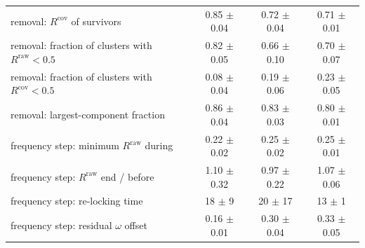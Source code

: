 \begin{tabular}{@{}lccc@{}}
removal: $R^{\mathrm{cov}}$ of survivors & 0.85 $\pm$ 0.04 & 0.72 $\pm$ 0.04 & 0.71 $\pm$ 0.01 \\
removal: fraction of clusters with $R^{\mathrm{raw}}<0.5$ & 0.82 $\pm$ 0.05 & 0.66 $\pm$ 0.10 & 0.70 $\pm$ 0.07 \\
removal: fraction of clusters with $R^{\mathrm{cov}}<0.5$ & 0.08 $\pm$ 0.04 & 0.19 $\pm$ 0.06 & 0.23 $\pm$ 0.05 \\
removal: largest-component fraction & 0.86 $\pm$ 0.04 & 0.83 $\pm$ 0.03 & 0.80 $\pm$ 0.01 \\
frequency step: minimum $R^{\mathrm{raw}}$ during & 0.22 $\pm$ 0.02 & 0.25 $\pm$ 0.02 & 0.25 $\pm$ 0.01 \\
frequency step: $R^{\mathrm{raw}}$ end / before & 1.10 $\pm$ 0.32 & 0.97 $\pm$ 0.22 & 1.07 $\pm$ 0.06 \\
frequency step: re-locking time & 18 $\pm$ 9 & 20 $\pm$ 17 & 13 $\pm$ 1 \\
frequency step: residual $\omega$ offset & 0.16 $\pm$ 0.01 & 0.30 $\pm$ 0.04 & 0.33 $\pm$ 0.05 \\
\bottomrule
\end{tabular}
